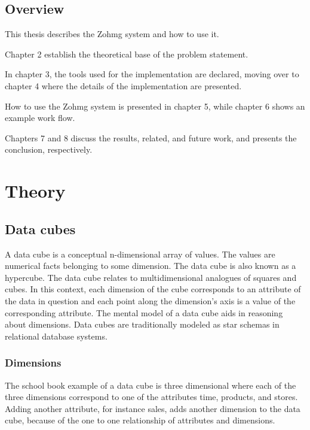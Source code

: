 \documentclass[a4paper,10pt]{book}
\begin{document}
\section{Overview}

This thesis describes the Zohmg system and how to use it.

Chapter 2 establish the theoretical base of the problem statement.

In chapter 3, the tools used for the implementation are declared, moving
over to chapter 4 where the details of the implementation are presented.

How to use the Zohmg system is presented in chapter 5, while chapter 6
shows an example work flow.

Chapters 7 and 8 discuss the results, related, and future work, and
presents the conclusion, respectively.




\chapter{Theory}

\section{Data cubes}

A data cube is a conceptual n-dimensional array of values. The values are
numerical facts belonging to some dimension. The data cube is also known as a
hypercube. The data cube relates to multidimensional analogues of squares and cubes.
In this context, each dimension of the cube corresponds to an attribute of
the data in question and each point along the dimension's axis is a value of
the corresponding attribute. The mental model of a data cube aids in
reasoning about dimensions. Data cubes are traditionally modeled as star
schemas in relational database systems. \cite{olap_solutions}


\subsection{Dimensions}

The school book example of a data cube is three dimensional where each of
the three dimensions correspond to one of the attributes time, products,
and stores. Adding another attribute, for instance sales, adds another
dimension to the data cube, because of the one to one relationship of
attributes and dimensions.
\end{document}
